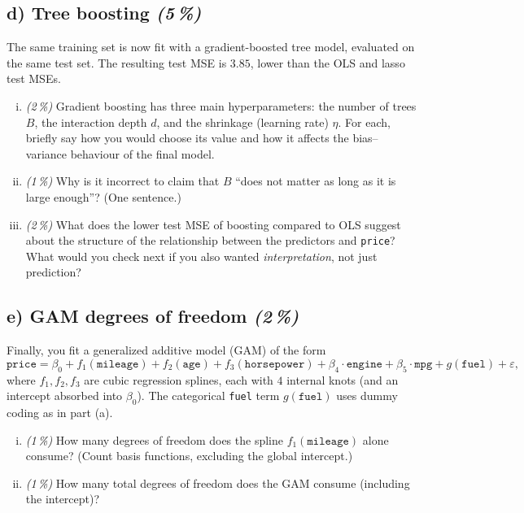\documentclass[11pt,a4paper]{article}
\newcommand{\subpoints}[1]{\textit{(#1\,\%)}}
\begin{document}
\subsection*{d) Tree boosting \subpoints{5}}

The same training set is now fit with a gradient-boosted tree model, evaluated on the same test set. The resulting test MSE is $3.85$, lower than the OLS and lasso test MSEs.

\begin{enumerate}[(i)]
  \item \subpoints{2} Gradient boosting has three main hyperparameters: the number of trees $B$, the interaction depth $d$, and the shrinkage (learning rate) $\eta$. For each, briefly say how you would choose its value and how it affects the bias--variance behaviour of the final model.
  \item \subpoints{1} Why is it incorrect to claim that $B$ ``does not matter as long as it is large enough''? (One sentence.)
  \item \subpoints{2} What does the lower test MSE of boosting compared to OLS suggest about the structure of the relationship between the predictors and \texttt{price}? What would you check next if you also wanted \emph{interpretation}, not just prediction?
\end{enumerate}

\subsection*{e) GAM degrees of freedom \subpoints{2}}
Finally, you fit a generalized additive model (GAM) of the form
$$\texttt{price} = \beta_0 + f_1(\texttt{mileage}) + f_2(\texttt{age}) + f_3(\texttt{horsepower}) + \beta_4 \cdot \texttt{engine} + \beta_5 \cdot \texttt{mpg} + g(\texttt{fuel}) + \varepsilon,$$
where $f_1, f_2, f_3$ are cubic regression splines, each with $4$ internal knots (and an intercept absorbed into $\beta_0$). The categorical \texttt{fuel} term $g(\texttt{fuel})$ uses dummy coding as in part (a).

\begin{enumerate}[(i)]
  \item \subpoints{1} How many degrees of freedom does the spline $f_1(\texttt{mileage})$ alone consume? (Count basis functions, excluding the global intercept.)
  \item \subpoints{1} How many total degrees of freedom does the GAM consume (including the intercept)?
\end{enumerate}
\end{document}
